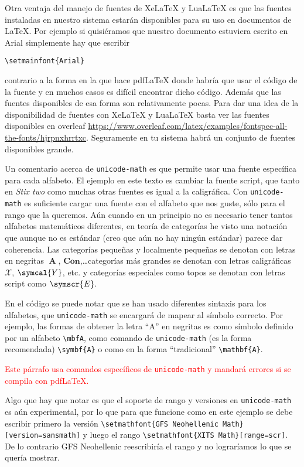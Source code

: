 Otra ventaja del manejo de fuentes de Xe\LaTeX{} y Lua\LaTeX{} es que las
fuentes instaladas en nuestro sistema estarán disponibles para su uso en
documentos de \LaTeX{}. Por ejemplo si quisiéramos que nuestro documento
estuviera escrito en Arial simplemente hay que escribir
\begin{flushleft}
  \verb|\setmainfont{Arial}|
\end{flushleft}
contrario a la forma en la que hace pdf\LaTeX{} donde habría que usar el
código de la fuente y en muchos casos es difícil encontrar dicho código.
Además que las fuentes disponibles de esa forma son relativamente pocas.
Para dar una idea de la disponibilidad de fuentes con Xe\LaTeX{} y
Lua\LaTeX{} basta ver las fuentes disponibles en overleaf \url{https://www.overleaf.com/latex/examples/fontspec-all-the-fonts/hjrpnxhrrtxc}.
Seguramente en tu sistema habrá un conjunto de fuentes disponibles grande.

\ifluatex%
Un comentario acerca de \texttt{unicode-math} es que permite usar una
fuente específica para cada alfabeto. El ejemplo en este texto es cambiar la
fuente script, que tanto en \textit{Stix two} como muchas otras fuentes es
igual a la caligráfica. Con \texttt{unicode-math} es suficiente cargar una
fuente con el alfabeto que nos guste, sólo para el rango que la queremos.
Aún cuando en un principio no es necesario tener tantos alfabetos matemáticos
diferentes, en teoría de categorías he visto una notación que aunque no es
estándar (creo que aún no hay ningún estándar) parece dar coherencia. Las
categorías pequeñas y localmente pequeñas se denotan con letras en negritas
\(\mbfA \), \(\symbf{Con}\),\ldots categorías más grandes se denotan con
letras caligráficas \(\mathcal{X}\), \(\symcal{Y}\), etc. y categorías
especiales como topos se denotan con letras script como \(\symscr{E}\).

En el código se puede notar que se han usado diferentes sintaxis para los
alfabetos, que \texttt{unicode-math} se encargará de mapear al símbolo
correcto. Por ejemplo, las formas de obtener la letra \enquote{A} en negritas es
como símbolo definido por un alfabeto \verb|\mbfA|, como comando de
\texttt{unicode-math} (es la forma recomendada) \verb|\symbf{A}| o como en
la forma \enquote{tradicional} \verb|\mathbf{A}|.
\else
\ifpdftex%
\begin{center}
  \textcolor{red}{Este párrafo usa comandos específicos de \texttt{unicode-math} y mandará errores si se compila con pdf\LaTeX.}
\end{center}
\fi
\fi

Algo que hay que notar es que el soporte de rango y versiones en
\texttt{unicode-math} es aún experimental, por lo que para que funcione como
en este ejemplo se debe escribir primero la versión
\verb|\setmathfont{GFS Neohellenic Math}[version=sansmath]|
y luego el rango \verb|\setmathfont{XITS Math}[range=scr]|. De lo contrario
GFS Neohellenic reescribiría el rango y no lograríamos lo que se quería
mostrar.
